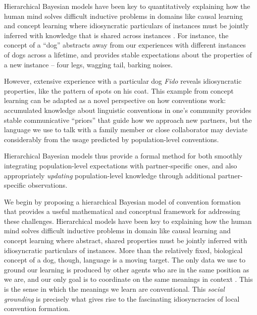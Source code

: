 Hierarchical Bayesian models have been key to quantitatively explaining how the human mind solves difficult inductive problems in domains like causal learning and concept learning where idiosyncratic particulars of instances must be jointly inferred with knowledge that is shared across instances .
For instance, the concept of a ``dog'' abstracts away from our experiences with different instances of dogs across a lifetime, and provides stable expectations about the properties of a new instance -- four legs, wagging tail, barking noises.

However, extensive experience with a particular dog \emph{Fido} reveals idiosyncratic properties, like the pattern of spots on his coat.
This example from concept learning can be adapted as a novel perspective on how conventions work: accumulated knowledge about linguistic conventions in one's community provides stable communicative ``priors'' that guide how we approach new partners, but the language we use to talk with a family member or close collaborator may deviate considerably from the usage predicted by population-level conventions.

Hierarchical Bayesian models thus provide a formal method for both smoothly integrating population-level expectations with partner-specific ones, and also appropriately \emph{updating} population-level knowledge through additional partner-specific observations. 

We begin by proposing a hierarchical Bayesian model of convention formation \cite{GelmanEtAl14_BDA,TenenbaumKempGriffithsGoodman11_Grow_a_Mind_Science} that provides a useful mathematical and conceptual framework for addressing these challenges. Hierarchical models have been key to explaining how the human mind solves difficult inductive problems in domain like causal learning \cite{KempGoodmanTenenbaum10_LearningToLearn,GoodmanUllmanTenenbaum11_TheoryOfCausality} and concept learning \cite{KempPerforsTenenbaum07_HBM} where abstract, shared properties must be jointly inferred with idiosyncratic particulars of instances. More than the relatively fixed, biological concept of a dog, though, language is a moving target. The only data we use to ground our learning is produced by other agents who are in the same position as we are, and our only goal is to coordinate on the same meanings in context \cite{HassonGhazanfar___Keysers12BrainToBrain}. This is the sense in which the meanings we learn are conventional. This \emph{social grounding} is precisely what gives rise to the fascinating idiosyncracies of local convention formation.

